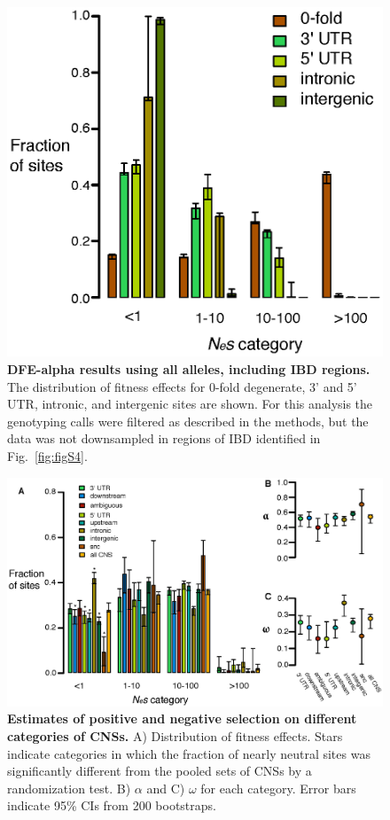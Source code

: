 \begin{figure}[ht!]
      \centering
       \includegraphics[width=\linewidth]{Ch2FigS6}
    \caption{\textbf{DFE-alpha results using all alleles, including IBD regions.} The distribution of fitness effects for 0-fold degenerate, 3’ and 5’ UTR, intronic, and intergenic sites are shown. For this analysis the genotyping calls were filtered as described in the methods, but the data was not downsampled in regions of IBD identified in Fig.~\ref{fig:figS4}.}
    \label{fig:figS6}
\end{figure}

\begin{figure}[ht!]
      \centering
       \includegraphics[width=\linewidth]{Ch2FigS7}
    \caption{\textbf{Estimates of positive and negative selection on different categories of CNSs.} A) Distribution of fitness effects. Stars indicate categories in which the fraction of nearly neutral sites was significantly different from the pooled sets of CNSs by a randomization test. B) $\alpha$ and C) $\omega$ for each category. Error bars indicate 95\% CIs from 200 bootstraps.}
    \label{fig:figS7}
\end{figure}

